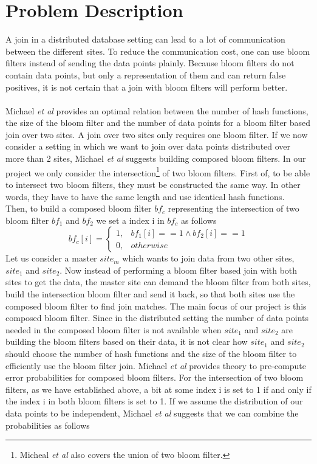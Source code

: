 \documentclass[12]{scrartcl}
\begin{document}
\section{Problem Description}
A join in a distributed database setting can lead to a lot of communication between the different sites. To reduce the communication cost, one can use bloom filters instead of sending the data points plainly. Because bloom filters do not contain data points, but only a representation of them and can return false positives, it is not certain that a join with bloom filters will perform better.\\\\
Michael {\em et al}\cite{michael} provides an optimal relation between the number of hash functions, the size of the bloom filter and the number of data points for a bloom filter based join over two sites. A join over two sites only requires one bloom filter. If we now consider a setting in which we want to join over data points distributed over more than 2 sites, Michael {\em et al}\cite{michael} suggests building composed bloom filters. In our project we only consider the intersection\footnote{Micheal {\em et al}\cite{michael} also covers the union of two bloom filter.} of two bloom filters. First of, to be able to intersect two bloom filters, they must be constructed the same way. In other words, they have to have the same length and use identical hash functions.\\ Then, to build a composed bloom filter $bf_c$ representing the intersection of two bloom filter  $bf_1$ and $bf_2$ we set a index i in $bf_c$ as follows
\begin{equation}
	bf_c[i] = 
	\begin{cases}
	1, & bf_1[i] == 1 \wedge bf_2[i] == 1\\
	0, & otherwise
	\end{cases}
\end{equation}
Let us consider a master $site_m$ which wants to join data from two other sites, $site_1$ and $site_2$. Now instead of performing a bloom filter based join with both sites to get the data, the master site can demand the bloom filter from both sites, build the intersection bloom filter and send it back, so that both sites use the composed bloom filter to find join matches. The main focus of our project is this composed bloom filter. Since in the distributed setting the number of data points needed in the composed bloom filter is not available when $site_1$ and $site_2$ are building the bloom filters based on their data, it is not clear how $site_1$ and $site_2$ should choose the number of hash functions and the size of the bloom filter to efficiently use the bloom filter join. Michael {\em et al}\cite{michael} provides theory to pre-compute error probabilities for composed bloom filters. For the intersection of two bloom filters, as we have established above, a bit at some index i is set to 1 if and only if the index i in both bloom filters is set to 1. If we assume the distribution of our data points to be independent, Michael {\em et al}\cite{michael} suggests that we can combine the probabilities as follows
\end{document}
